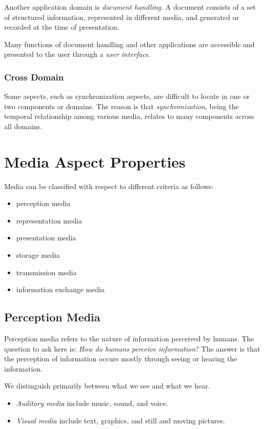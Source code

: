 	Another application domain is \textit{document handling}. A document consists of a set of structured information, represented in different media, and generated or recorded at the time of presentation.
	
	Many functions of document handling and other applications are accessible and presented to the user through a \textit{user interface}.
	
\subsubsection*{Cross Domain}
Some aspects, such as synchronization aspects, are difficult to locate in one or two components or domains. The reason is that \textit{synchronization}, being the temporal relationship among various media, relates to many components across all domains.


\section{Media Aspect Properties}
Media can be classified with respect to different criteria as follows:
\begin{multicols}{2}
	\begin{itemize}
	\item perception media 
	\item representation media
	\item presentation media
	\item storage media
	\item transmission media
	\item information exchange media
	\end{itemize}
\end{multicols}


\subsection{Perception Media}
Perception media refers to the nature of information perceived by humans. The question to ask here is: \emph{How do humans perceive information}? The answer is that the perception of information occurs mostly through seeing or hearing the information.

We distinguish primarily between what we see and what we hear. 
\begin{itemize}
	\item \textit{Auditory media} include music, sound, and voice. 
	\item \textit{Visual media} include text, graphics, and still and moving pictures.
\end{itemize}


